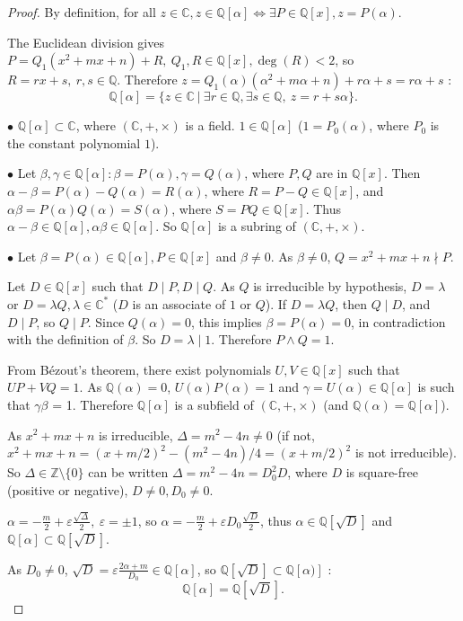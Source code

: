 \documentclass[11pt,a4paper]{article}
\newcommand{\Q}{\mathbb{Q}}
\newcommand{\Z}{\mathbb{Z}}
\newcommand{\C}{\mathbb{C}}
\begin{document}
\begin{proof}
By definition, for all $z \in \C, z \in \Q[\alpha] \iff \exists P \in \Q[x], z = P(\alpha)$.

The Euclidean division gives $P = Q_1 (x^2+mx+n) + R, \ Q_1,R  \in \Q[x], \deg(R) < 2$, so $R = rx+s,\ r,s \in \Q$. Therefore $z = Q_1(\alpha) (\alpha^2+m\alpha+n) + r\alpha + s = r\alpha + s$ :
$$\Q[\alpha] = \{z \in \C\ \vert \ \exists r \in \Q, \exists s \in \Q, \ z = r+s \alpha\}.$$

$\bullet$ $\Q[\alpha] \subset \C$, where $(\C,+,\times)$ is a field. $1 \in \Q[\alpha]$ ($1 = P_0(\alpha)$, where $P_0$ is the constant polynomial $1$).

$\bullet$ Let $\beta, \gamma \in \Q[\alpha] : \beta = P(\alpha), \gamma = Q(\alpha)$, where $P,Q$ are in $\Q[x]$.
Then $\alpha - \beta =  P(\alpha) -  Q(\alpha) = R(\alpha)$, where $R = P-Q \in \Q[x]$, and $\alpha \beta =  P(\alpha) Q(\alpha) = S(\alpha)$, where $S = PQ \in \Q[x]$. Thus $\alpha - \beta \in \Q[\alpha], \alpha \beta \in \Q[\alpha]$. So $\Q[\alpha]$ is a subring of $(\C,+,\times)$.

$\bullet$ Let $\beta = P(\alpha) \in \Q[\alpha], P \in \Q[x]$ and $\beta \neq 0$.
As $\beta \ne 0$, $Q = x^2+mx+n \nmid P$. 

Let $D \in \Q[x]$  such that $D \mid P,D \mid Q$. As $Q$ is irreducible by hypothesis, $D = \lambda$ or $D = \lambda Q, \lambda \in \C^*$ ($D$ is an associate of $1$ or $Q$). If $D = \lambda Q$, then $Q \mid D$, and $D \mid P$, so $Q \mid P$. Since $Q(\alpha) = 0$,  this implies $\beta = P(\alpha) = 0$, in contradiction with the definition of $\beta$. So $D = \lambda \mid 1$. Therefore $P\wedge Q = 1$. 

From B\'{e}zout's theorem, there exist polynomials $U,V \in \Q[x]$ such that $UP+VQ = 1$. As $\Q(\alpha) = 0$, $U(\alpha) P(\alpha) = 1$ and $\gamma = U(\alpha) \in \Q[\alpha]$ is such that $\gamma \beta$ = 1. Therefore $\Q[\alpha]$ is a subfield of $(\C,+,\times)$ (and $\Q(\alpha) = \Q[\alpha]$).

As $x^2+mx+n$ is irreducible, $\Delta = m^2-4n \ne 0$ (if not, $x^2+mx +n = (x+m/2)^2 -(m^2 -4n)/4 = (x +m/2)^2$ is not irreducible). So $\Delta \in \Z \setminus\{ 0\}$ can be written $\Delta = m^2 - 4n = D_0^2D$, where $D$ is square-free (positive or negative), $D \neq 0, D_0 \neq 0$.

$\alpha = -\frac{m}{2} + \varepsilon\frac{\sqrt{\Delta}}{2},\ \varepsilon = \pm 1$, 
so $\alpha = -\frac{m}{2} + \varepsilon D_0 \frac{\sqrt{D}}{2}$, thus  $\alpha \in \Q[\sqrt{D}]$ and $\Q[\alpha] \subset \Q[\sqrt{D}]$.

 As $D_0 \neq 0$, $\sqrt{D} = \varepsilon \frac{2 \alpha + m}{D_0} \in \Q[\alpha]$, 
 so $\Q[\sqrt{D}] \subset \Q[\alpha)]$ :
$$\Q[\alpha] = \Q[\sqrt{D}].$$ 
\end{proof}
\end{document}
